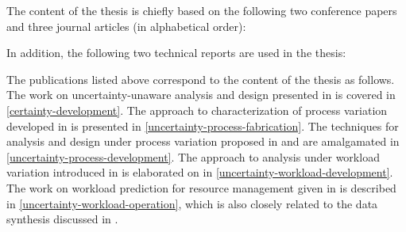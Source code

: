 The content of the thesis is chiefly based on the following two conference
papers and three journal articles (in alphabetical order):

\printbibliography[heading=none,keyword=own]

In addition, the following two technical reports are used in the thesis:

\printbibliography[heading=none,keyword=own-unpublished]

The publications listed above correspond to the content of the thesis as
follows. The work on uncertainty-unaware analysis and design presented in
\cite{ukhov2012} is covered in \cref{certainty-development}. The approach to
characterization of process variation developed in \cite{ukhov2014a} is
presented in \cref{uncertainty-process-fabrication}. The techniques for analysis
and design under process variation proposed in \cite{ukhov2014b} and
\cite{ukhov2015} are amalgamated in \cref{uncertainty-process-development}. The
approach to analysis under workload variation introduced in \cite{ukhov2017a} is
elaborated on in \cref{uncertainty-workload-development}. The work on workload
prediction for resource management given in \cite{ukhov2017b} is described in
\cref{uncertainty-workload-operation}, which is also closely related to the data
synthesis discussed in \cite{ukhov2017c}.
